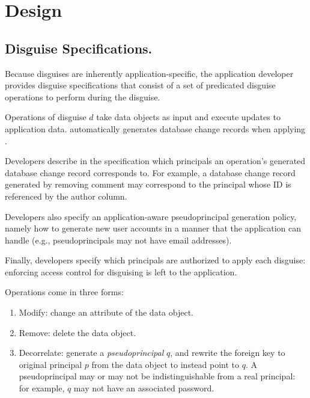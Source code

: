 \section{Design} 

\subsection{Disguise Specifications.} 
Because disguises are inherently application-specific, the application developer provides disguise
specifications that consist of a set of predicated disguise operations  to perform during the
disguise.

Operations  of disguise $d$ take data objects as input and execute updates to application
data.  \sys automatically generates database change records when applying . 

Developers describe in the specification which principals an operation's generated database change
record corresponds to.  For example, a database change record generated by removing comment may
correspond to the principal whose ID is referenced by the author column.  

Developers also specify an application-aware pseudoprincipal generation policy, namely how to
generate new user accounts in a manner that the application can handle (e.g., pseudoprincipals may
not have email addresses).

Finally, developers specify which principals are authorized to apply each disguise: enforcing
access control for disguising is left to the application.

\vspace{6pt}\noindent
Operations come in three forms:
\begin{enumerate}
    \item Modify: change an attribute of the data object.
    \item Remove: delete the data object.
    \item Decorrelate: generate a \emph{pseudoprincipal} $q$, and rewrite the foreign key to original
        principal $p$ from the data object to instead point to $q$.
        A pseudoprincipal may or may not be indistinguishable from a real principal: for example,
        $q$ may not have an associated password.
\end{enumerate}

